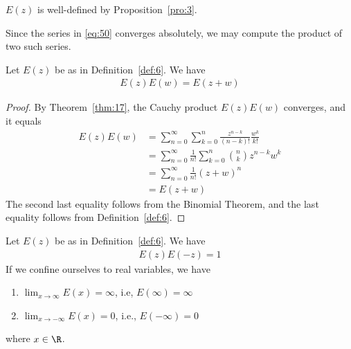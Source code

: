 \documentclass[thmcnt=section, 12pt]{elegantbook}
\begin{document}
\begin{remark}
    $E(z)$ is well-defined by Proposition~\ref{pro:3}.
\end{remark}


\par Since the series in \eqref{eq:50} converges absolutely, we may compute the product of two such series.

\begin{proposition} \label{pro:4}
    Let $E(z)$ be as in Definition~\ref{def:6}. We have 
    \begin{align*}
        E(z)E(w) = E(z + w)
    \end{align*}
\end{proposition}

\begin{proof}
    By Theorem~\ref{thm:17}, the Cauchy product $E(z)E(w)$ converges, and it equals
    \begin{align*}
        E(z)E(w)
        &= \sum_{n=0}^\infty \sum_{k=0}^n \frac{z^{n-k}}{(n-k)!} \frac{w^k}{k!} \\ 
        &= \sum_{n=0}^\infty \frac{1}{n!} \sum_{k=0}^n \binom{n}{k} z^{n-k} w^k \\ 
        &= \sum_{n=0}^\infty \frac{1}{n!} (z+w)^n \\ 
        &= E(z+w)
    \end{align*}
    The second last equality follows from the Binomial Theorem, and the last equality follows from Definition~\ref{def:6}.
\end{proof}


\begin{proposition} \label{pro:5}
    Let $E(z)$ be as in Definition~\ref{def:6}. We have 
    \begin{align*}
        E(z) E(-z) = 1
    \end{align*}
    If we confine ourselves to real variables, we have 
    \begin{enumerate}
        \item $\lim_{x\to\infty} E(x) = \infty$, i.e, $E(\infty) = \infty$
        \item $\lim_{x\to -\infty} E(x) = 0$, i.e., $E(-\infty) = 0$
    \end{enumerate}
    where $x \in \R$.
\end{proposition}

\end{document}
